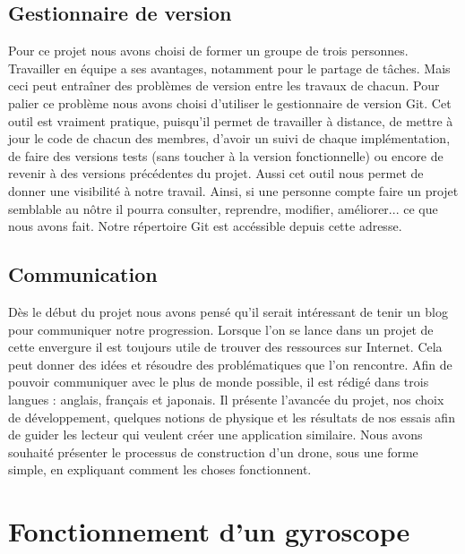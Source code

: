 \documentclass[a4paper,10pt]{report}
\begin{document}
      \section{Gestionnaire de version}
	Pour ce projet nous avons choisi de former un groupe de trois 
personnes. Travailler en équipe a ses avantages, notamment pour le partage de 
tâches. Mais ceci peut entraîner des   problèmes de version entre les travaux de 
chacun. Pour palier ce problème nous avons choisi d'utiliser le gestionnaire 
de version Git. Cet outil est vraiment pratique, puisqu'il permet de travailler 
à distance, de mettre à jour le code de chacun des membres, d'avoir un suivi de 
chaque implémentation, de faire des versions tests (sans toucher à la version 
fonctionnelle) ou encore de revenir à des versions précédentes du projet. Aussi 
cet outil nous permet de donner une visibilité à notre travail. Ainsi, si une 
personne compte faire un projet semblable au nôtre il pourra consulter, 
reprendre, modifier, améliorer... ce que nous avons fait. Notre répertoire Git 
est accéssible depuis cette adresse\cite{njordgit}.
	
      \section{Communication}
	Dès le début du projet nous avons pensé qu'il serait intéressant de 
tenir un blog\cite{njordblog} pour communiquer notre progression. Lorsque l'on 
se lance dans un projet de cette envergure il est toujours utile de trouver 
des ressources sur Internet. Cela peut donner des idées et résoudre des 
problématiques que l'on rencontre. Afin de pouvoir communiquer avec le plus de 
monde possible, il est rédigé dans trois langues : anglais, français et 
japonais. Il présente l'avancée du projet, nos choix de développement, quelques 
notions de physique et les résultats de nos essais afin de guider les lecteur 
qui veulent créer une application similaire. Nous avons souhaité présenter le 
processus de construction d'un drone, sous une forme simple, en expliquant 
comment les choses fonctionnent.
	
    \chapter{Fonctionnement d'un gyroscope}

  \listoffigures
  
  \raggedright
  
  
\end{document}
